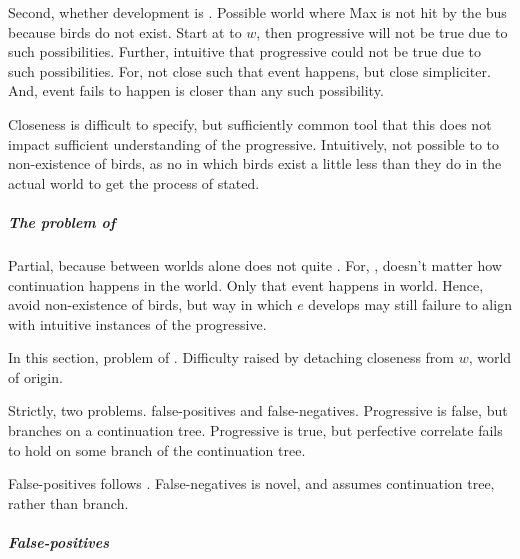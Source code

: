 \begin{note}
  Second, whether development is \drAdj{}.
  Possible world where Max is not hit by the bus because birds do not exist.
  Start at  to \(w\), then progressive will not be true due to such possibilities.
  Further, intuitive that progressive could not be true due to such possibilities.
  For, not close such that event happens, but close simpliciter.
  And, event fails to happen is closer than any such possibility.
\end{note}

\begin{note}
  Closeness is difficult to specify, but sufficiently common tool that this does not impact sufficient understanding of the progressive.
  Intuitively, not possible to  to non-existence of birds, as no  in which birds exist a little less than they do in the actual world to get the process of  stated.
\end{note}

\subparagraph{The problem of \ndrAdj{} }
\label{drift:problem}


\begin{note}
  Partial, because between worlds alone does not quite .
  For, , doesn't matter how continuation happens in the world.
  Only that event happens in world.
  Hence, avoid non-existence of birds, but way in which \(e\) develops may still failure to align with intuitive instances of the progressive.
\end{note}

\begin{note}
  In this section, problem of \ndrAdj{} .
  Difficulty raised by detaching closeness from \(w\), world of origin.

  Strictly, two problems.
  false-positives and false-negatives.
  Progressive is false, but branches on a continuation tree.
  Progressive is true, but perfective correlate fails to hold on some branch of the continuation tree.

  False-positives follows \citeauthor{Landman:1992wh}.
  False-negatives is novel, and assumes continuation tree, rather than branch.
\end{note}

\subparagraph*{False-positives}

